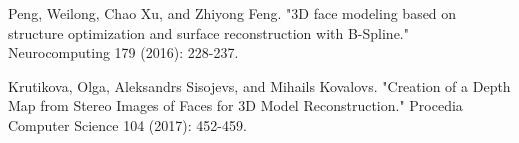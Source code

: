 \documentclass[journal]{IEEEtran}
\begin{document}


%
%
%
\begin{thebibliography}{9}

Peng, Weilong, Chao Xu, and Zhiyong Feng. "3D face modeling based on structure optimization and surface reconstruction with B-Spline." Neurocomputing 179 (2016): 228-237.

Krutikova, Olga, Aleksandrs Sisojevs, and Mihails Kovalovs. "Creation of a Depth Map from Stereo Images of Faces for 3D Model Reconstruction." Procedia Computer Science 104 (2017): 452-459.

\end{thebibliography}

% 


\end{document}
